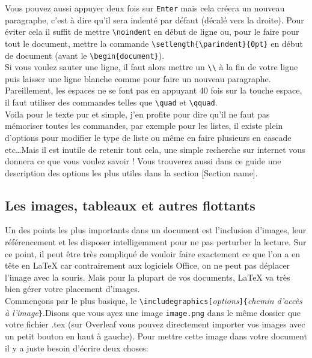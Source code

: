 \documentclass[11pt]{article}				%
\newcommand{\tb}{\textbackslash}
\newcommand{\cmdoi}[3][]{\texttt{\textbackslash #2}\texttt{[}\textit{#1}\texttt{]\{}\textit{#3}\texttt{\}}}
\begin{document}
Vous pouvez aussi appuyer deux fois sur \texttt{Enter} mais cela créera un nouveau paragraphe, c'est à dire qu'il sera indenté par défaut (décalé vers la droite). Pour éviter cela il suffit de mettre \texttt{\tb noindent} en début de ligne ou, pour le faire pour tout le document, mettre la commande \texttt{\tb setlength\{\tb parindent\}\{0pt\}} en début de document (avant le \texttt{\tb begin\{document\}}).\\
Si vous voulez sauter une ligne, il faut alors mettre un \texttt{\tb \tb} à la fin de votre ligne puis laisser une ligne blanche comme pour faire un nouveau paragraphe.\\
Pareillement, les espaces ne se font pas en appuyant 40 fois sur la touche espace, il faut utiliser des commandes telles que \texttt{\tb quad} et \texttt{\tb qquad}.\\

Voila pour le texte pur et simple, j'en profite pour dire qu'il ne faut pas mémoriser toutes les commandes, par exemple pour les listes, il existe plein d'options pour modifier le type de liste ou même en faire plusieurs en cascade etc\dots Mais il est inutile de retenir tout cela, une simple recherche sur internet vous donnera ce que vous voulez savoir ! Vous trouverez aussi dans ce guide une description des options les plus utiles dans la section [Section name].

\subsection{Les images, tableaux et autres flottants}

Un des points les plus importants dans un document est l'inclusion d'images, leur référencement et les disposer intelligemment pour ne pas perturber la lecture. Sur ce point, il peut être très compliqué de vouloir faire exactement ce que l'on a en tête en LaTeX car contrairement aux logiciels Office, on ne peut pas déplacer l'image avec la souris.
Mais pour la plupart de vos documents, LaTeX va très bien gérer votre placement d'images.\\

Commençons par le plus basique, le \cmdoi[options]{includegraphics}{\textit{chemin d'accès à l'image}}.Disons que vous ayez une image \texttt{image.png} dans le même dossier que votre fichier .tex (sur Overleaf vous pouvez directement importer vos images avec un petit bouton en haut à gauche). Pour mettre cette image dans votre document il y a juste besoin d'écrire deux choses: \\
\end{document}
